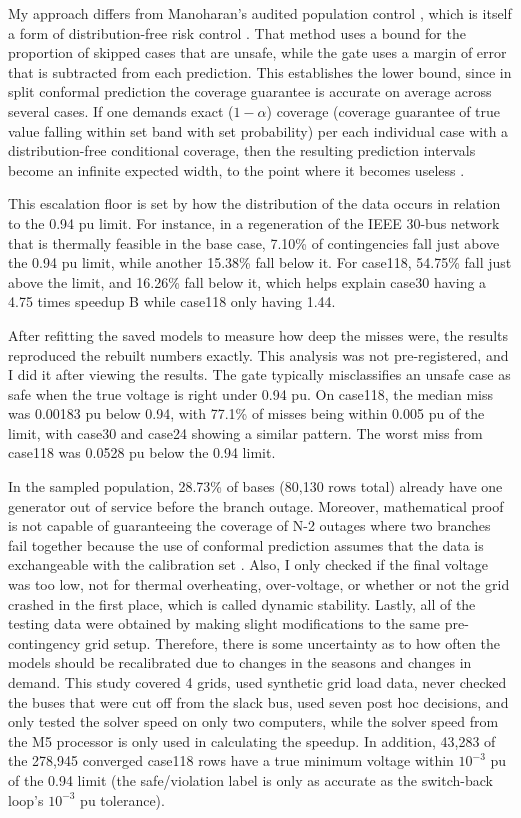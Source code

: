 \documentclass[12pt]{article}
\begin{document}
My approach differs from Manoharan's audited population control \cite{manoharan2026}, which is itself a form of distribution-free risk control \cite{bates2021}. That method uses a bound for the proportion of skipped cases that are unsafe, while the gate uses a margin of error that is subtracted from each prediction. This establishes the lower bound, since in split conformal prediction the coverage guarantee is accurate on average across several cases. If one demands exact ($1-\alpha$) coverage (coverage guarantee of true value falling within set band with set probability) per each individual case with a distribution-free conditional coverage, then the resulting prediction intervals become an infinite expected width, to the point where it becomes useless \cite{barber2021}.

This escalation floor is set by how the distribution of the data occurs in relation to the 0.94 pu limit. For instance, in a regeneration of the IEEE 30-bus network that is thermally feasible in the base case, 7.10\% of contingencies fall just above the 0.94 pu limit, while another 15.38\% fall below it. For case118, 54.75\% fall just above the limit, and 16.26\% fall below it, which helps explain case30 having a 4.75 times speedup B while case118 only having 1.44.

After refitting the saved models to measure how deep the misses were, the results reproduced the rebuilt numbers exactly. This analysis was not pre-registered, and I did it after viewing the results. The gate typically misclassifies an unsafe case as safe when the true voltage is right under 0.94 pu. On case118, the median miss was 0.00183 pu below 0.94, with 77.1\% of misses being within 0.005 pu of the limit, with case30 and case24 showing a similar pattern. The worst miss from case118 was 0.0528 pu below the 0.94 limit. 

In the sampled population, 28.73\% of bases (80{,}130 rows total) already have one generator out of service before the branch outage. Moreover, mathematical proof is not capable of guaranteeing the coverage of N-2 outages where two branches fail together because the use of conformal prediction assumes that the data is exchangeable with the calibration set \cite{vovk2005}. Also, I only checked if the final voltage was too low, not for thermal overheating, over-voltage, or whether or not the grid crashed in the first place, which is called dynamic stability. Lastly, all of the testing data were obtained by making slight modifications to the same pre-contingency grid setup. Therefore, there is some uncertainty as to how often the models should be recalibrated due to changes in the seasons and changes in demand. This study covered 4 grids, used synthetic grid load data, never checked the buses that were cut off from the slack bus, used seven post hoc decisions, and only tested the solver speed on only two computers,  while the solver speed from the M5 processor is only used in calculating the speedup. In addition, 43,283 of the 278,945 converged case118 rows have a true minimum voltage within $10^{-3}$ pu of the 0.94 limit (the safe/violation label is only as accurate as the switch-back loop's $10^{-3}$ pu tolerance).
\end{document}
